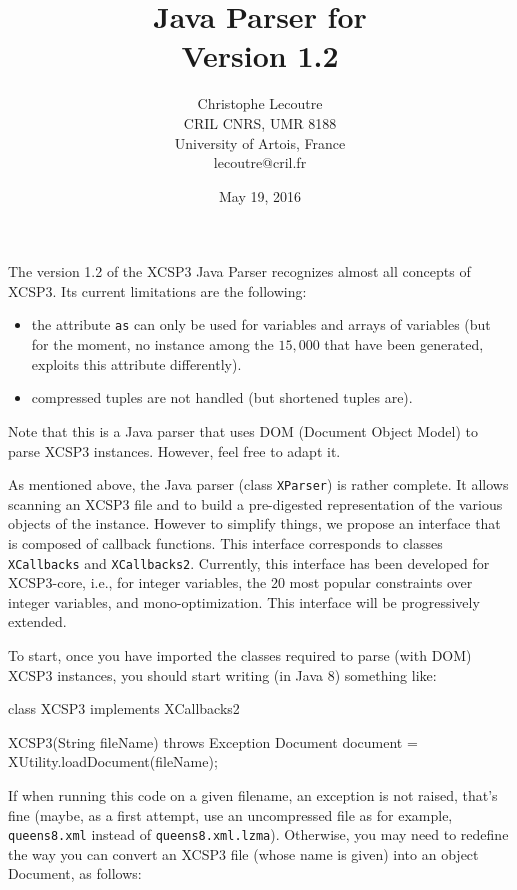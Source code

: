 \documentclass[10pt]{article}
\title{\textcolor{dred}{Java Parser for \xt}\\ \textcolor{dred}{Version 1.2}}
\author{Christophe Lecoutre \\
CRIL CNRS, UMR 8188\\ University of Artois, France \\
lecoutre@cril.fr
}
\date{May 19, 2016}
\newenvironment{boxabsc}
               {\medskip \begin{bclogo}[barre=none,arrondi=0.2,logo=]{}\vspace{-0.6cm}}
               {\vspace{-0.1cm}\end{bclogo} \smallskip}
\def\xt{{\rm XCSP3}\xspace}
\newcommand{\att}[1]{{\tt #1}} %
\newcommand{\nn}[1]{{\tt #1}} %
\begin{document}
\maketitle


The version 1.2 of the \xt Java Parser recognizes almost all concepts of \xt.
Its current limitations are the following:
\begin{itemize}
\item the attribute \att{as} can only be used for variables and arrays of variables (but for the moment, no instance among the $15,000$ that have been generated, exploits this attribute differently).
\item compressed tuples are not handled (but shortened tuples are).
\end{itemize}


\bigskip
Note that this is a Java parser that uses DOM (Document Object Model) to parse XCSP3 instances.
However, feel free to adapt it.

\bigskip
As mentioned above, the Java parser (class \nn{XParser}) is rather complete.
It allows scanning an XCSP3 file and to build a pre-digested representation of the various objects of the instance.
However to simplify things, we propose an interface that is composed of callback functions.
This interface corresponds to classes  \nn{XCallbacks} and \nn{XCallbacks2}.
Currently, this interface has been developed for XCSP3-core, i.e., for integer variables, the 20 most popular constraints over integer variables, and mono-optimization.
This interface will be progressively extended.

\bigskip
To start, once you have imported the classes required to parse (with DOM) \xt instances, 
you should start writing (in Java 8) something like:

\begin{boxabsc}
\begin{absc}
class XCSP3 implements XCallbacks2 { 

  XCSP3(String fileName) throws Exception {
    Document document = XUtility.loadDocument(fileName);
  }
}  
\end{absc} 
\end{boxabsc}

If when running this code on a given filename, an exception is not raised, that's fine (maybe, as a first attempt, use an uncompressed file as for example, \nn{queens8.xml} instead of  \nn{queens8.xml.lzma}).
Otherwise, you may need to redefine the way you can convert an XCSP3 file (whose name is given) into an object Document, as follows:
\end{document}
